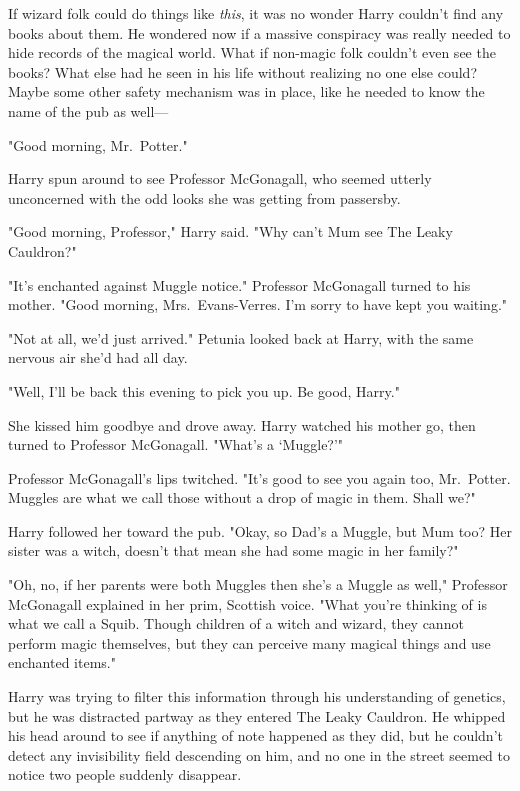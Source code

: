 If wizard folk could do things like \emph{this}, it was no wonder
Harry couldn't find any books about them. He wondered
now if a massive conspiracy was really needed to hide
records of the magical world. What if non-magic folk
couldn't even see the books? What else had he seen in
his life without realizing no one else could? Maybe some
other safety mechanism was in place, like he needed to
know the name of the pub as well—

"Good morning, Mr.~Potter."

Harry spun around to see Professor McGonagall, who
seemed utterly unconcerned with the odd
looks she was getting from passersby.

"Good morning, Professor," Harry said. "Why can't Mum
see The Leaky Cauldron?"

"It's enchanted against Muggle notice." Professor McGonagall
turned to his mother. "Good morning, Mrs.~Evans-Verres.
I'm sorry to have kept you waiting."

"Not at all, we'd just arrived." Petunia looked back at
Harry, with the same nervous air she'd had all day.

"Well, I'll be back this evening to pick you up. Be good, Harry."

She kissed him goodbye and drove away. Harry watched his mother
go, then turned to Professor McGonagall. "What's a `Muggle?'"

Professor McGonagall's lips twitched. "It's good to see you
again too, Mr.~Potter. Muggles are what we call those
without a drop of magic in them. Shall we?"

Harry followed her toward the pub. "Okay, so Dad's a
Muggle, but Mum too? Her sister was a witch, doesn't that
mean she had some magic in her family?"

"Oh, no, if her parents were both Muggles then she's
a Muggle as well," Professor McGonagall explained in her prim,
Scottish voice. "What you're thinking of is what we call a
Squib. Though children of a witch and wizard, they cannot
perform magic themselves, but they can perceive
many magical things and use enchanted items."

Harry was trying to filter this information through his
understanding of genetics, but he was distracted partway as
they entered The Leaky Cauldron. He whipped his head
around to see if anything of note happened as they did,
but he couldn't detect any invisibility field descending on him,
and no one in the street seemed to notice two people
suddenly disappear.


